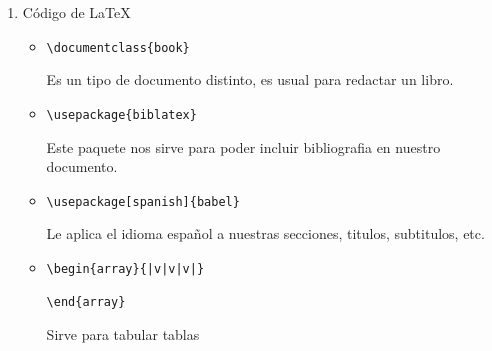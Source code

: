 \documentclass{book}
\begin{document}
\begin{enumerate}
\begin{itemize}
		
	\end{itemize}%
	\item Código de LaTeX
	\begin{itemize}
		\item 
		\begin{lstlisting}
\documentclass{book}
		\end{lstlisting} Es un tipo de documento distinto, es usual para redactar un libro.
		\item  
		\begin{lstlisting}  
\usepackage{biblatex}
		\end{lstlisting} Este paquete nos sirve para poder incluir bibliografia en nuestro documento. 
		\item 
		\begin{lstlisting}  
\usepackage[spanish]{babel}
		\end{lstlisting} Le aplica el idioma español a nuestras secciones, titulos, subtitulos, etc. 
		\item 
		\begin{lstlisting}  
\begin{array}{|v|v|v|}
	
\end{array}
		\end{lstlisting} Sirve para tabular tablas\\
		

\end{itemize}
\end{enumerate}
\end{document}
